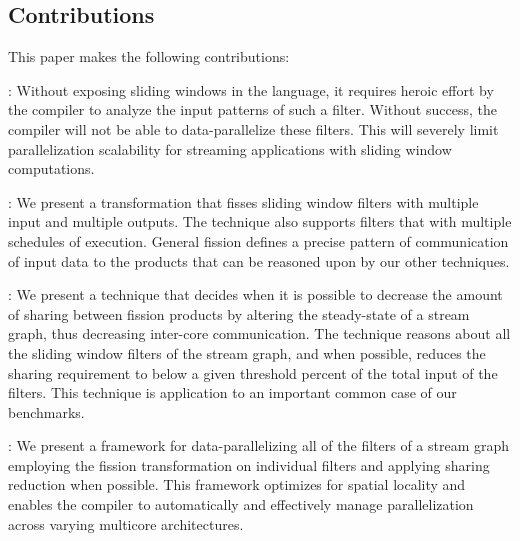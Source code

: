 \subsection{Contributions}
This paper makes the following contributions:
\begin{itemize}
  : Without exposing sliding windows in the language, it
  requires heroic effort by the compiler to analyze the input patterns
  of such a filter. Without success, the compiler will not be able to
  data-parallelize these filters.  This will severely limit
  parallelization scalability for streaming applications with sliding
  window computations.

  : We present a
  transformation that fisses sliding window filters with multiple
  input and multiple outputs.  The technique also supports filters
  that with multiple schedules of execution.  General fission defines
  a precise pattern of communication of input data to the products
  that can be reasoned upon by our other techniques.

  : We present a technique that decides when
  it is possible to decrease the amount of sharing between fission
  products by altering the steady-state of a stream graph, thus
  decreasing inter-core communication.  The technique reasons about
  all the sliding window filters of the stream graph, and when
  possible, reduces the sharing requirement to below a given threshold
  percent of the total input of the filters.  This technique is
  application to an important common case of our benchmarks.

  : We present a
  framework for data-parallelizing all of the filters of a stream
  graph employing the fission transformation on individual filters and
  applying sharing reduction when possible.  This framework optimizes
  for spatial locality and enables the compiler to automatically and
  effectively manage parallelization across varying multicore
  architectures.
\end{itemize}
